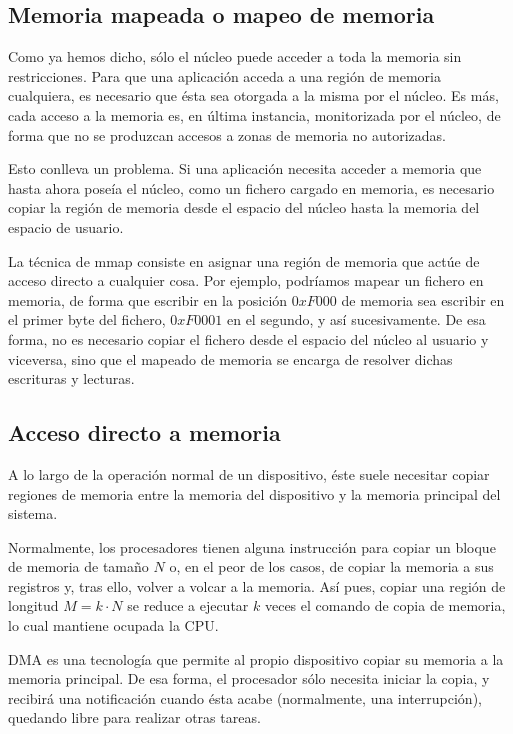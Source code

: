 \subsection{Memoria mapeada o mapeo de memoria}
Como ya hemos dicho, sólo el núcleo puede acceder a toda la memoria sin restricciones. Para que una aplicación acceda a 
una región de memoria cualquiera, es necesario que ésta sea otorgada a la misma por el núcleo. Es más, cada acceso a 
la memoria es, en última instancia, monitorizada por el núcleo, de forma que no se produzcan accesos a zonas de memoria 
no autorizadas.

Esto conlleva un problema. Si una aplicación necesita acceder a memoria que hasta ahora poseía el núcleo, como un 
fichero cargado en memoria, es necesario copiar la región de memoria desde el espacio del núcleo hasta la memoria del 
espacio de usuario.

La técnica de \gls{mmap} consiste en asignar una región de memoria que actúe de acceso directo a 
cualquier cosa. Por ejemplo, podríamos mapear un fichero en memoria, de forma que escribir en la posición $0xF000$ de 
memoria sea escribir en el primer byte del fichero, $0xF0001$ en el segundo, y así sucesivamente. De esa forma, no es 
necesario copiar el fichero desde el espacio del núcleo al usuario y viceversa, sino que el mapeado de memoria se 
encarga de resolver dichas escrituras y lecturas.

\subsection{Acceso directo a memoria}
A lo largo de la operación normal de un dispositivo, éste suele necesitar copiar regiones de memoria entre la memoria 
del dispositivo y la memoria principal del sistema.

Normalmente, los procesadores tienen alguna instrucción para copiar un bloque de memoria de tamaño $N$ o, en el peor de 
los casos, de copiar la memoria a sus registros y, tras ello, volver a volcar a la memoria. Así pues, copiar una región 
de longitud $M=k\cdot N$ se reduce a ejecutar $k$ veces el comando de copia de memoria, lo cual mantiene ocupada la CPU.

\gls{DMA} es una tecnología que permite al propio dispositivo copiar su memoria a la memoria principal. De esa forma, 
el procesador sólo necesita iniciar la copia, y recibirá una notificación cuando ésta acabe (normalmente, una 
interrupción), quedando libre para realizar otras tareas.



